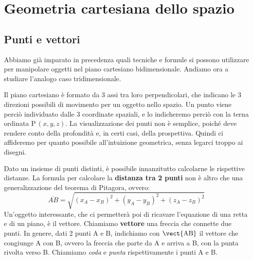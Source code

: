 
\newcommand{\vettcol}[3]{\begin{pmatrix}
#1\\ #2\\ #3
\end{pmatrix}}


\chapter{Geometria cartesiana dello spazio}

\section{Punti e vettori}
\label{sec:Punti_e_vettori}

Abbiamo già imparato in precedenza quali tecniche e formule si possono utilizzare per manipolare oggetti nel piano cartesiano bidimensionale. Andiamo ora a studiare l'analogo caso tridimensionale. 

\vspace{7pt}

Il piano cartesiano è formato da 3 assi tra loro perpendicolari, che indicano le 3 direzioni possibili di movimento per un oggetto nello spazio. Un punto viene perciò individuato dalle 3 coordinate spaziali, e lo indicheremo perciò con la terna ordinata P\,\((x,y,z)\). La visualizzazione dei punti non è semplice, poiché deve rendere conto della profondità e, in certi casi, della prospettiva. Quindi ci affideremo per quanto possibile all'intuizione geometrica, senza legarci troppo ai disegni.

\vspace{7pt}

Dato un insieme di punti distinti, è possibile innanzitutto calcolarne le rispettive distanze. La formula per calcolare la \textbf{distanza tra 2 punti} non è altro che una generalizzazione del teorema di Pitagora, ovvero:
\[\overline{AB} = \sqrt{(x_A-x_B)^2+(y_A-y_B)^2+(z_A-z_B)^2}\]
Un'oggetto interessante, che ci permetterà poi di ricavare l'equazione di una retta e di un piano, è il vettore. Chiamiamo \textbf{vettore} una freccia che connette due punti. In genere, dati 2 punti A e B, indichiamo con \(\vect{\text{AB}}\) il vettore che congiunge A con B, ovvero la freccia che parte da A e arriva a B, con la punta rivolta verso B. Chiamiamo \emph{coda} e \emph{punta} rispettivamente i punti A e B. 

\vspace{7pt}

